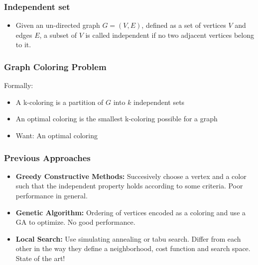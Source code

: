 \documentclass{beamer}
\begin{document}
\begin{frame}
\frametitle{Independent set}
\begin{itemize}
\item Given an un-directed graph $G=(V,E)$, defined as a set of vertices $V$ and edges $E$, a subset of $V$ is called independent if no two adjacent vertices belong to it.
\end{itemize}
\end{frame}


\begin{frame}
\frametitle{Graph Coloring Problem}
\large{Formally:}
\begin{itemize}
\item A k-coloring is a partition of $G$ into $k$ independent sets
\item An optimal coloring is the smallest k-coloring possible for a graph
\item Want: An optimal coloring
\end{itemize}
\end{frame}

\begin{frame}
\frametitle{Previous Approaches}
\begin{itemize}
\item {\bf Greedy Constructive Methods:} Succesively choose a vertex and a color such that the independent property holds according to some criteria. Poor performance in general.
\item {\bf Genetic Algorithm:} Ordering of vertices encoded as a coloring and use a GA to optimize. No good performance.
\item {\bf Local Search:} Use simulating annealing or tabu search. Differ from each other in the way they define a neighborhood, cost function and search space. State of the art!
\end{itemize}
\end{frame}

\end{document}
